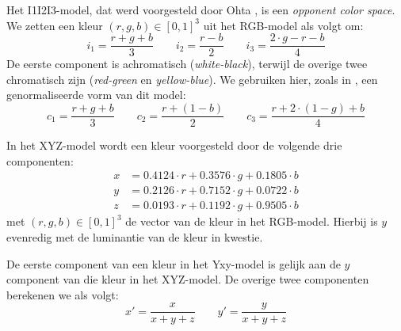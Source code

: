 Het I1I2I3-model, dat werd voorgesteld door Ohta 
\cite{ohta:color_info_for_region_segm}, is een \emph{opponent color space}. 
We zetten een kleur $(r,g,b) \in 
[0,1]^3$ uit het RGB-model als volgt om:
\begin{displaymath}
i_1 = \frac{r+g+b}{3} \qquad i_2 = \frac{r-b}{2} \qquad i_3 = \frac{2 \cdot g - 
r - b}{4}
\end{displaymath}
De eerste component is achromatisch (\emph{white-black}), terwijl de overige 
twee chromatisch zijn (\emph{red-green} en \emph{yellow-blue}).
We gebruiken hier, zoals in \cite{wang:cbir_using_daubechies_wavelets}, een 
genormaliseerde vorm van dit model:
\begin{displaymath}
c_1 = \frac{r+g+b}{3} \qquad c_2 = \frac{r + (1 - b)}{2} \qquad c_3 = \frac{r + 
2 \cdot (1 - g) + b}{4}
\end{displaymath}

In het XYZ-model wordt een kleur voorgesteld door de volgende drie componenten: 
\begin{align*}
x & = 0.4124 \cdot r + 0.3576 \cdot g + 0.1805 \cdot b \\
y & = 0.2126 \cdot r + 0.7152 \cdot g + 0.0722 \cdot b \\
z & = 0.0193 \cdot r + 0.1192 \cdot g + 0.9505 \cdot b
\end{align*}
met $(r,g,b) \in [0,1]^3$ de vector van de kleur in het RGB-model. Hierbij 
is $y$ evenredig met de luminantie van de kleur in kwestie. 

De eerste component van een kleur in het Yxy-model is gelijk aan de $y$ 
component van die kleur in het XYZ-model. De overige twee componenten berekenen 
we als volgt:
\begin{displaymath}
x' = \frac{x}{x+y+z} \qquad y' = \frac{y}{x+y+z}
\end{displaymath}

